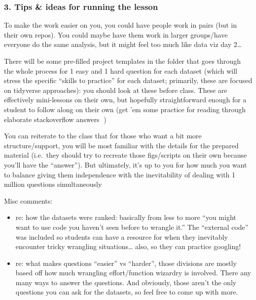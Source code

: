 \documentclass[
  letterpaper,
  DIV=11,
  numbers=noendperiod]{scrreprt}
\begin{document}
\begin{tcolorbox}
\hypertarget{tips-ideas-for-running-the-lesson}{%
\subsubsection{3. Tips \& ideas for running the
lesson}\label{tips-ideas-for-running-the-lesson}}

To make the work easier on you, you could have people work in pairs (but
in their own repos). You could maybe have them work in larger
groups/have everyone do the same analysis, but it might feel too much
like data viz day 2\ldots{}

There will be some pre-filled project templates in the folder that goes
through the whole process for 1 easy and 1 hard question for each
dataset (which will stress the specific ``skills to practice'' for each
dataset; primarily, these are focused on tidyverse approaches): you
should look at these before class. These are effectively mini-lessons on
their own, but hopefully straightforward enough for a student to follow
along on their own (get 'em some practice for reading through elaborate
stackoverflow answers 🥹)

You can reiterate to the class that for those who want a bit more
structure/support, you will be most familiar with the details for the
prepared material (i.e.~they should try to recreate those figs/scripts
on their own because you'll have the ``answer''). But ultimately, it's
up to you for how much you want to balance giving them independence with
the inevitability of dealing with 1 million questions simultaneously 🫡

Misc comments:

\begin{itemize}
\item
  re: how the datasets were ranked: basically from less to more ``you
  might want to use code you haven't seen before to wrangle it.'' The
  ``external code'' was included so students can have a resource for
  when they inevitably encounter tricky wrangling situations\ldots{}
  also, so they can practice googling!
\item
  re: what makes questions ``easier'' vs ``harder'', those divisions are
  mostly based off how much wrangling effort/function wizardry is
  involved. There any many ways to answer the questions. And obviously,
  those aren't the only questions you can ask for the datasets, so feel
  free to come up with more.
\end{itemize}

\end{tcolorbox}
\end{document}

